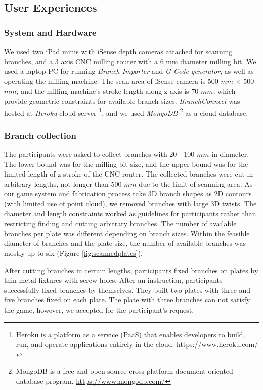 \subsection{User Experiences}
\subsubsection*{System and Hardware}
We used two iPad minis with iSense depth cameras attached for scanning branches, and a 3 axis CNC milling router with a 6 mm diameter milling bit.
We used a laptop PC for running \textit{Branch Importer} and \textit{G-Code generator}, as well as operating the milling machine.
The scan area of iSense camera is 500 $mm$ $\times$ 500 $mm$, and the milling machine's stroke length along z-axis is 70 $mm$, which provide geometric constraints for available branch sizes.
\textit{BranchConnect} was hosted at \textit{Heroku} cloud server \footnote{Heroku is a platform as a service (PaaS) that enables developers to build, run, and operate applications entirely in the cloud. \url{https://www.heroku.com/}},
and we used \textit{MongoDB} \footnote{MongoDB is a free and open-source cross-platform document-oriented database program. \url{https://www.mongodb.com/}} as a cloud database.

\subsubsection*{Branch collection}
The participants were asked to collect branches with 20 - 100 $mm$ in diameter.
The lower bound was for the milling bit size, and the upper bound was for the limited length of z-stroke of the CNC router.
The collected branches were cut in arbitrary lengths, not longer than 500 $mm$ due to the limit of scanning area. 
As our game system and fabrication process take 3D branch shapes as 2D contours (with limited use of point cloud), we removed branches with large 3D twists.
The diameter and length constraints worked as guidelines for participants rather than restricting finding and cutting arbitrary branches.
The number of available branches per plate was different depending on branch sizes.
Within the feasible diameter of branches and the plate size, the number of available branches was mostly up to six (Figure \ref{fig:scannedplates}).

After cutting branches in certain lengths, participants fixed branches on plates by thin metal fixtures with screw holes.
After an instruction, participants successfully fixed branches by themselves.
They built two plates with three and five branches fixed on each plate.
The plate with three branches can not satisfy the game, however, we accepted for the participant's request.

